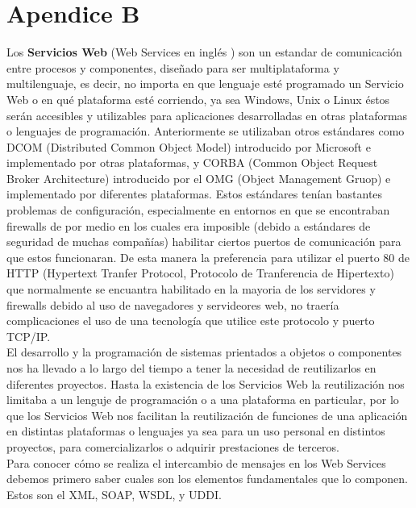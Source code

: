 \documentclass[12pt,letterpaper,titlepage]{article}
\begin{document}
\section{Apendice B}\label{apendiceb}



Los \textbf{Servicios Web} (Web Services en inglés ) son un estandar de comunicación entre procesos y componentes, diseñado para ser multiplataforma y multilenguaje, es decir, no importa en que lenguaje esté programado un Servicio Web o en qué plataforma esté corriendo, ya sea Windows, Unix o Linux éstos serán accesibles y utilizables para aplicaciones desarrolladas en otras plataformas o lenguajes de programación. Anteriormente se utilizaban otros estándares como DCOM (Distributed Common Object Model) introducido por Microsoft e implementado por otras plataformas, y CORBA (Common Object Request Broker Architecture) introducido por el OMG (Object Management Gruop) e implementado por diferentes plataformas. Estos estándares tenían bastantes problemas de configuración, especialmente en entornos en que se encontraban firewalls de por medio en los cuales era imposible (debido a estándares de seguridad de muchas compañías) habilitar ciertos puertos de comunicación para que estos funcionaran. De esta manera la preferencia para utilizar el puerto 80 de HTTP (Hypertext Tranfer Protocol, Protocolo de Tranferencia de Hipertexto) que normalmente se encuantra habilitado en la mayoria de los servidores y firewalls debido al uso de navegadores y servideores web, no traería complicaciones el uso de una tecnología que utilice este protocolo y puerto TCP/IP.\\

El desarrollo y la programación de sistemas prientados a objetos o componentes nos ha llevado a lo largo del tiempo a tener la necesidad de reutilizarlos en diferentes proyectos. Hasta la existencia de los Servicios Web la reutilización nos limitaba a un lenguje de programación o a una plataforma en particular, por lo que los Servicios Web nos facilitan la reutilización de funciones de una aplicación en distintas plataformas o lenguajes ya sea para un uso personal en distintos proyectos, para comercializarlos o adquirir prestaciones de terceros. \cite{134}\\

Para conocer cómo se realiza el intercambio de mensajes en los Web Services debemos primero saber cuales son los elementos fundamentales que lo componen. Estos son el XML, SOAP, WSDL, y UDDI.\\
\end{document}
